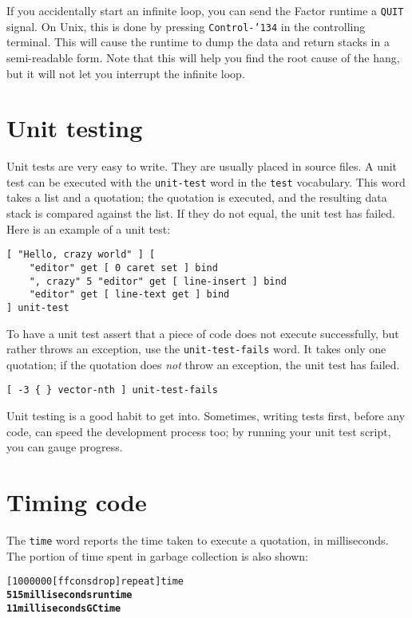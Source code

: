 \documentclass{book}
\newcommand{\bs}{\char'134}
\begin{document}
If you accidentally start an infinite loop, you can send the Factor runtime a \texttt{QUIT} signal. On Unix, this is done by pressing \texttt{Control-\bs} in the controlling terminal. This will cause the runtime to dump the data and return stacks in a semi-readable form. Note that this will help you find the root cause of the hang, but it will not let you interrupt the infinite loop.

\section{Unit testing}

Unit tests are very easy to write. They are usually placed in source files. A unit test can be executed with the \texttt{unit-test} word in the \texttt{test} vocabulary. This word takes a list and a quotation; the quotation is executed, and the resulting data stack is compared against the list. If they do not equal, the unit test has failed. Here is an example of a unit test:

\begin{verbatim}
[ "Hello, crazy world" ] [
    "editor" get [ 0 caret set ] bind
    ", crazy" 5 "editor" get [ line-insert ] bind
    "editor" get [ line-text get ] bind
] unit-test
\end{verbatim}

To have a unit test assert that a piece of code does not execute successfully, but rather throws an exception, use the \texttt{unit-test-fails} word. It takes only one quotation; if the quotation does \emph{not} throw an exception, the unit test has failed.

\begin{verbatim}
[ -3 { } vector-nth ] unit-test-fails
\end{verbatim}

Unit testing is a good habit to get into. Sometimes, writing tests first, before any code, can speed the development process too; by running your unit test script, you can gauge progress.

\section{Timing code}

The \texttt{time} word reports the time taken to execute a quotation, in milliseconds. The portion of time spent in garbage collection is also shown:

\begin{alltt}
  [ 1000000 [ f f cons drop ] repeat ] time
\textbf{515 milliseconds run time
11 milliseconds GC time}
\end{alltt}
\end{document}
